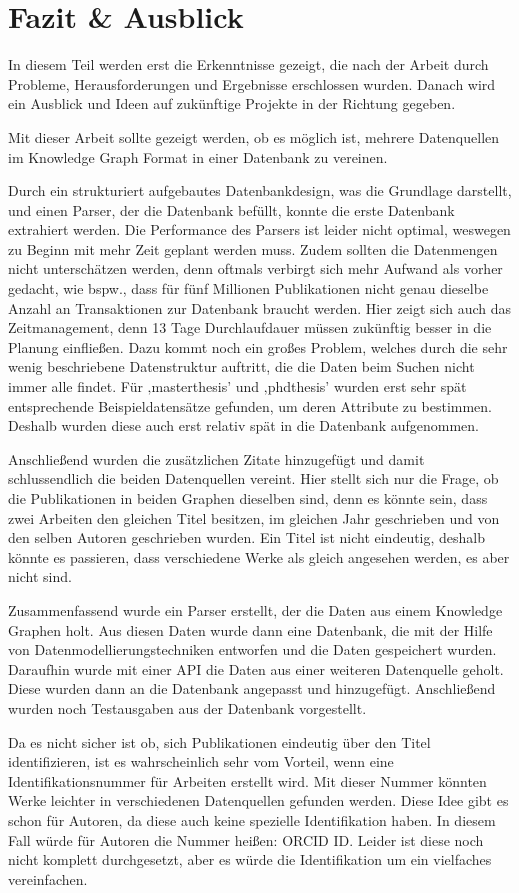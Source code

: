 \newpage
\section{Fazit \& Ausblick}

In diesem Teil werden erst die Erkenntnisse gezeigt, die nach der Arbeit durch Probleme, Herausforderungen und Ergebnisse erschlossen wurden. Danach wird ein Ausblick und Ideen auf zukünftige Projekte in der Richtung gegeben.

Mit dieser Arbeit sollte gezeigt werden, ob es möglich ist, mehrere Datenquellen im Knowledge Graph Format in einer Datenbank zu vereinen. 

Durch ein strukturiert aufgebautes Datenbankdesign, was die Grundlage darstellt, und einen Parser, der die Datenbank befüllt, konnte die erste Datenbank extrahiert werden. Die Performance des Parsers ist leider nicht optimal, weswegen zu Beginn mit mehr Zeit geplant werden muss. Zudem sollten die Datenmengen nicht unterschätzen werden, denn oftmals verbirgt sich mehr Aufwand als vorher gedacht, wie bspw., dass für fünf Millionen Publikationen nicht genau dieselbe Anzahl an Transaktionen zur Datenbank braucht werden. Hier zeigt sich auch das Zeitmanagement, denn 13 Tage Durchlaufdauer müssen zukünftig besser in die Planung einfließen. Dazu kommt noch ein großes Problem, welches durch die sehr wenig beschriebene Datenstruktur auftritt, die die Daten beim Suchen nicht immer alle findet. Für ‚masterthesis’ und ‚phdthesis’ wurden erst sehr spät entsprechende Beispieldatensätze gefunden, um deren Attribute zu bestimmen. Deshalb wurden diese auch erst relativ spät in die Datenbank aufgenommen.


Anschließend wurden die zusätzlichen Zitate hinzugefügt und damit schlussendlich die beiden Datenquellen vereint. Hier stellt sich nur die Frage, ob die Publikationen in beiden Graphen dieselben sind, denn es könnte sein, dass zwei Arbeiten den gleichen Titel besitzen, im gleichen Jahr geschrieben und von den selben Autoren geschrieben wurden. Ein Titel ist nicht eindeutig, deshalb könnte es passieren, dass verschiedene Werke als gleich angesehen werden, es aber nicht sind. 

Zusammenfassend wurde ein Parser erstellt, der die Daten aus einem Knowledge Graphen holt. Aus diesen Daten wurde dann eine Datenbank, die mit der Hilfe von Datenmodellierungstechniken entworfen und die Daten gespeichert wurden. Daraufhin wurde mit einer API die Daten aus einer weiteren Datenquelle geholt. Diese wurden dann an die Datenbank angepasst und hinzugefügt. Anschließend wurden noch Testausgaben aus der Datenbank vorgestellt. 

Da es nicht sicher ist ob, sich Publikationen eindeutig über den Titel identifizieren, ist es wahrscheinlich sehr vom Vorteil, wenn eine Identifikationsnummer für Arbeiten erstellt wird. Mit dieser Nummer könnten Werke leichter in verschiedenen Datenquellen gefunden werden. Diese Idee gibt es schon für Autoren, da diese auch keine spezielle Identifikation haben. In diesem Fall würde für Autoren die Nummer heißen: ORCID ID. Leider ist diese noch nicht komplett durchgesetzt, aber es würde die Identifikation um ein vielfaches vereinfachen.
